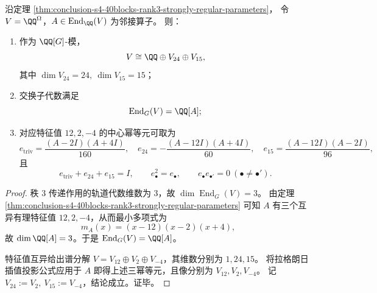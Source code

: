 \begin{theorem}[邻接算子生成的交换子代数与显式中心幂等元]\label{thm:conclusion-s4-40blocks-commutant-idempotents-explicit}
沿定理 \ref{thm:conclusion-s4-40blocks-rank3-strongly-regular-parameters}，
令 \(V=\QQ^\Omega\)，\(A\in \operatorname{End}_\QQ(V)\) 为邻接算子。
则：
\begin{enumerate}
  \item 作为 \(\QQ[G]\)-模，
  \[
  V\cong \QQ\oplus V_{24}\oplus V_{15},
  \]
  其中 \(\dim V_{24}=24,\ \dim V_{15}=15\)；
  \item 交换子代数满足
  \[
  \operatorname{End}_G(V)=\QQ[A];
  \]
  \item 对应特征值 \(12,2,-4\) 的中心幂等元可取为
  \[
  e_{\mathrm{triv}}=\frac{(A-2I)(A+4I)}{160},\quad
  e_{24}=-\frac{(A-12I)(A+4I)}{60},\quad
  e_{15}=\frac{(A-12I)(A-2I)}{96},
  \]
  且
  \[
  e_{\mathrm{triv}}+e_{24}+e_{15}=I,\qquad
  e_\bullet^2=e_\bullet,\qquad
  e_\bullet e_{\bullet'}=0\ (\bullet\neq \bullet').
  \]
\end{enumerate}
\end{theorem}
\begin{proof}
秩 \(3\) 传递作用的轨道代数维数为 \(3\)，故
\(
\dim \operatorname{End}_G(V)=3
\)。
由定理
\ref{thm:conclusion-s4-40blocks-rank3-strongly-regular-parameters}
可知 \(A\) 有三个互异有理特征值 \(12,2,-4\)，从而最小多项式为
\[
m_A(x)=(x-12)(x-2)(x+4),
\]
故 \(\dim \QQ[A]=3\)。于是 \(\operatorname{End}_G(V)=\QQ[A]\)。

特征值互异给出谱分解
\(
V=V_{12}\oplus V_2\oplus V_{-4}
\)，其维数分别为 \(1,24,15\)。
将拉格朗日插值投影公式应用于 \(A\) 即得上述三幂等元，且像分别为
\(
V_{12},V_2,V_{-4}
\)。
记
\(
V_{24}:=V_2,\ V_{15}:=V_{-4}
\)，结论成立。证毕。
\end{proof}

